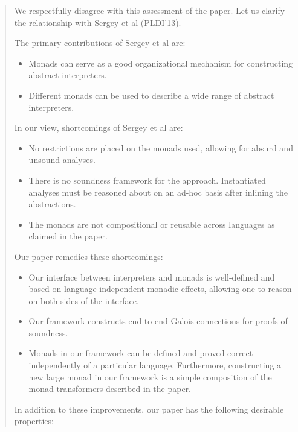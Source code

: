 \documentclass[nocopyrightspace,preprint,10pt]{sigplanconf}
\begin{document}
\begin{quote}
We respectfully disagree with this assessment of the paper. Let us clarify the
relationship with Sergey et al \cite{dvanhorn:Sergey2013Monadic} (PLDI'13).

The primary contributions of Sergey et al are:

\begin{itemize}
\item Monads can serve as a good organizational mechanism for constructing abstract
  interpreters.
\item Different monads can be used to describe a wide range of abstract
  interpreters.
\end{itemize}

In our view, shortcomings of Sergey et al are:

\begin{itemize}
\item No restrictions are placed on the monads used, allowing for
  absurd and unsound analyses.

\item There is no soundness framework for the approach. Instantiated
  analyses must be reasoned about on an ad-hoc basis after inlining
  the abstractions.

\item The monads are not compositional or reusable across languages as
  claimed in the paper.
\end{itemize}

Our paper remedies these shortcomings:

\begin{itemize}
\item Our interface between interpreters and monads is well-defined
  and based on language-independent monadic effects, allowing one to
  reason on both sides of the interface.

\item Our framework constructs end-to-end Galois connections for
  proofs of soundness.

\item Monads in our framework can be defined and proved correct
independently of a particular language.  Furthermore, constructing a
new large monad in our framework is a simple composition of the monad
transformers described in the paper.
\end{itemize}

In addition to these improvements, our paper has the following
desirable properties:


\end{quote}
\end{document}
